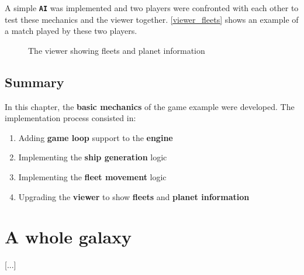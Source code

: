 \documentclass[a4paper,11pt,titlepage,abstract,numbers=noenddot,automark,mnsy,intlimits,rgb,dvipsnames]{report}
\begin{document}
A simple \textbf{\texttt{AI}} was implemented and two players were confronted with each other to test these mechanics and the viewer together.
\autoref{viewer_fleets} shows an example of a match played by these two players.
\begin{figure}[H]
\noindent{}
\caption{The viewer showing fleets and planet information}
\label{viewer_fleets}
\end{figure}
\section{Summary}
In this chapter, the \textbf{basic mechanics} of the game example were developed. The implementation process consisted in:
\begin{enumerate}
\item
Adding \textbf{game loop} support to the \textbf{engine}
\item
Implementing the \textbf{ship generation} logic
\item
Implementing the \textbf{fleet movement} logic
\item
Upgrading the \textbf{viewer} to show \textbf{fleets} and \textbf{planet information}
\end{enumerate}
\chapter{A whole galaxy}
\label{whole_galaxy}
[...]
\end{document}
